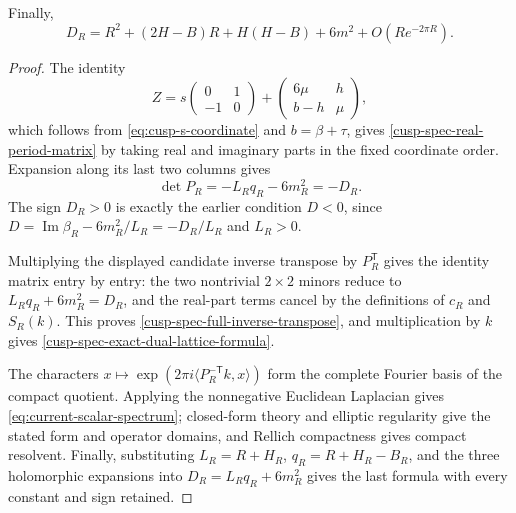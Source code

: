 \begin{proposition}
Finally,
\begin{equation}
 D_R=R^2+(2H-B)R+H(H-B)+6m^2+O(Re^{-2\pi R}).
 \label{cusp-spec-D-expansion}
\end{equation}
\end{proposition}

\begin{proof}
The identity
\[
 Z=s\begin{pmatrix}0&1\\-1&0\end{pmatrix}
 +\begin{pmatrix}6\mu&h\\b-h&\mu\end{pmatrix},
\]
which follows from \eqref{eq:cusp-s-coordinate} and \(b=\beta+\tau\),
gives \eqref{cusp-spec-real-period-matrix} by taking real and imaginary
parts in the fixed coordinate order.  Expansion along its last two columns
gives
\[
 \det P_R=-L_Rq_R-6m_R^2=-D_R.
\]
The sign \(D_R>0\) is exactly the earlier condition \(D<0\), since
\(D=\operatorname{Im}\beta_R-6m_R^2/L_R=-D_R/L_R\) and \(L_R>0\).

Multiplying the displayed candidate inverse transpose by \(P_R^{\mathsf T}\)
gives the identity matrix entry by entry: the two nontrivial \(2\times2\)
minors reduce to \(L_Rq_R+6m_R^2=D_R\), and the real-part terms cancel by
the definitions of \(c_R\) and \(S_R(k)\).  This proves
\eqref{cusp-spec-full-inverse-transpose}, and multiplication by \(k\)
gives \eqref{cusp-spec-exact-dual-lattice-formula}.

The characters
\(x\mapsto\exp(2\pi i\langle P_R^{-\mathsf T}k,x\rangle)\) form the complete
Fourier basis of the compact quotient.  Applying the nonnegative Euclidean
Laplacian gives \eqref{eq:current-scalar-spectrum}; closed-form theory and
elliptic regularity give the stated form and operator domains, and Rellich
compactness gives compact resolvent.  Finally, substituting
\(L_R=R+H_R\), \(q_R=R+H_R-B_R\), and the three holomorphic expansions into
\(D_R=L_Rq_R+6m_R^2\) gives the last formula with every constant and sign
retained.
\end{proof}
